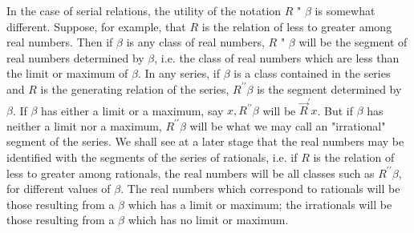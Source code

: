 \documentclass[10pt]{article}
\begin{document}
In the case of serial relations, the utility of the notation $R$ " $\beta$ is somewhat different. Suppose, for example, that $R$ is the relation of less to greater among real numbers. Then if $\beta$ is any class of real numbers, $R$ " $\beta$ will be the segment of real numbers determined by $\beta$, i.e. the class of real numbers which are less than the limit or maximum of $\beta$. In any series, if $\beta$ is a class contained in the series and $R$ is the generating relation of the series, $R^{\prime \prime} \beta$ is the segment determined by $\beta$. If $\beta$ has either a limit or a maximum, say $x, R^{\prime \prime} \beta$ will be $\vec{R}^{\prime} x$. But if $\beta$ has neither a limit nor a maximum, $R^{\prime \prime} \beta$ will be what we may call an "irrational" segment of the series. We shall see at a later stage that the real numbers may be identified with the segments of the series of rationals, i.e. if $R$ is the relation of less to greater among rationals, the real numbers will be all classes such as $R^{\prime \prime} \beta$, for different values of $\beta$. The real numbers which correspond to rationals will be those resulting from a $\beta$ which has a limit or maximum; the irrationals will be those resulting from a $\beta$ which has no limit or maximum.
\end{document}
